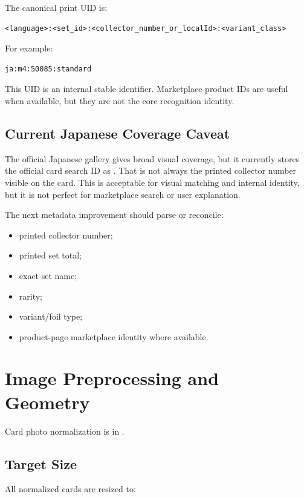 \documentclass[11pt,a4paper]{article}
\begin{document}
The canonical print UID is:

\begin{lstlisting}
<language>:<set_id>:<collector_number_or_localId>:<variant_class>
\end{lstlisting}

For example:

\begin{lstlisting}
ja:m4:50085:standard
\end{lstlisting}

This UID is an internal stable identifier. Marketplace product IDs are useful when available, but they are not the core recognition identity.

\subsection{Current Japanese Coverage Caveat}

The official Japanese gallery gives broad visual coverage, but it currently stores the official card search ID as . That is not always the printed collector number visible on the card. This is acceptable for visual matching and internal identity, but it is not perfect for marketplace search or user explanation.

The next metadata improvement should parse or reconcile:

\begin{itemize}
  \item printed collector number;
  \item printed set total;
  \item exact set name;
  \item rarity;
  \item variant/foil type;
  \item product-page marketplace identity where available.
\end{itemize}

\section{Image Preprocessing and Geometry}

Card photo normalization is in .

\subsection{Target Size}

All normalized cards are resized to:
\end{document}
